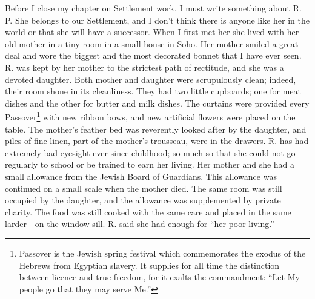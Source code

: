 Before I close my chapter on Settlement work, I must
write something about R. P\@. She belongs to our Settlement,
and I don’t think there is anyone like her in the
world or that she will have a successor. When I first met
her she lived with her old mother in a tiny room in a
small house in Soho. Her mother smiled a great deal
and wore the biggest and the most decorated bonnet that
I have ever seen. R. was kept by her mother to the
strictest path of rectitude, and she was a devoted daughter.
Both mother and daughter were scrupulously clean;
indeed, their room shone in its cleanliness. They had two
little cupboards; one for meat dishes and the other for
butter and milk dishes. The curtains were provided
every Passover\footnote{Passover is the Jewish spring
festival which commemorates the exodus
of the Hebrews from Egyptian slavery. It supplies for all time the
distinction between licence and true freedom, for it exalts the commandment:
“Let My people go that they may serve Me.”}
with new ribbon bows, and new artificial
flowers were placed on the table. The mother’s feather
bed was reverently looked after by the daughter, and
piles of fine linen, part of the mother’s trousseau, were
in the drawers. R. has had extremely bad eyesight ever
since childhood; so much so that she could not go regularly
to school or be trained to earn her living. Her
mother and she had a small allowance from the Jewish
Board of Guardians. This allowance was continued on
a small scale when the mother died. The same room was
still occupied by the daughter, and the allowance was
supplemented by private charity. The food was still
cooked with the same care and placed in the same
larder—on the window sill. R. said she had enough for “her
poor living.”

